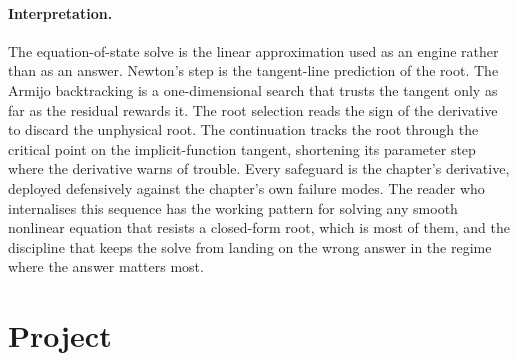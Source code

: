 \paragraph{Interpretation.}
The equation-of-state solve is the linear approximation used as an
engine rather than as an answer. Newton's step is the tangent-line
prediction of the root. The Armijo backtracking is a one-dimensional
search that trusts the tangent only as far as the residual rewards it.
The root selection reads the sign of the derivative to discard the
unphysical root. The continuation tracks the root through the critical
point on the implicit-function tangent, shortening its parameter step
where the derivative warns of trouble. Every safeguard is the chapter's
derivative, deployed defensively against the chapter's own failure
modes. The reader who internalises this sequence has the working pattern
for solving any smooth nonlinear equation that resists a closed-form
root, which is most of them, and the discipline that keeps the solve
from landing on the wrong answer in the regime where the answer matters
most.

\section{Project}

